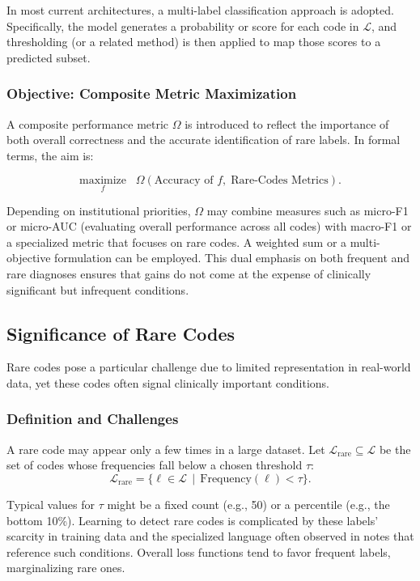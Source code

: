 In most current architectures, a multi-label classification approach is adopted. Specifically, the model generates a probability or score for each code in \(\mathcal{L}\), and thresholding (or a related method) is then applied to map those scores to a predicted subset.

\subsubsection{Objective: Composite Metric Maximization}
A composite performance metric \(\Omega\) is introduced to reflect the importance of both overall correctness and the accurate identification of rare labels. In formal terms, the aim is:

\begin{equation}
\underset{f}{\text{maximize}}\;\;\; \Omega(\text{Accuracy of } f,\;\text{Rare-Codes Metrics}).
\label{eq:p1:objomega}
\end{equation}

Depending on institutional priorities, \(\Omega\) may combine measures such as micro-F1 or micro-AUC (evaluating overall performance across all codes) with macro-F1 or a specialized metric that focuses on rare codes. A weighted sum or a multi-objective formulation can be employed. This dual emphasis on both frequent and rare diagnoses ensures that gains do not come at the expense of clinically significant but infrequent conditions.

\subsection{Significance of Rare Codes}
\label{sec:p1:rare_codes}

Rare codes pose a particular challenge due to limited representation in real-world data, yet these codes often signal clinically important conditions.

\subsubsection{Definition and Challenges}
A rare code may appear only a few times in a large dataset. Let \(\mathcal{L}_{\mathrm{rare}} \subseteq \mathcal{L}\) be the set of codes whose frequencies fall below a chosen threshold \(\tau\):
\[
\mathcal{L}_{\text{rare}} 
= 
\{\ell \in \mathcal{L} \,\mid\, \text{Frequency}(\ell) < \tau\}.
\]

Typical values for \(\tau\) might be a fixed count (e.g., 50) or a percentile (e.g., the bottom 10\%). Learning to detect rare codes is complicated by these labels' scarcity in training data and the specialized language often observed in notes that reference such conditions. Overall loss functions tend to favor frequent labels, marginalizing rare ones.

